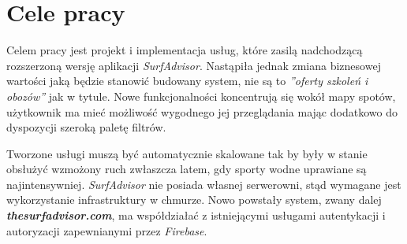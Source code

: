 \newpage

\section{Cele pracy}
Celem pracy jest projekt i implementacja usług, które zasilą nadchodzącą rozszerzoną wersję aplikacji \emph{SurfAdvisor}.
Nastąpiła jednak zmiana biznesowej wartości jaką będzie stanowić budowany system, nie są to \emph{''oferty szkoleń i obozów''} jak w tytule.
Nowe funkcjonalności koncentrują się wokół mapy spotów, użytkownik ma mieć możliwość wygodnego jej przeglądania mając dodatkowo do dyspozycji szeroką paletę filtrów.

Tworzone usługi muszą być automatycznie skalowane tak by były w stanie obsłużyć wzmożony ruch zwłaszcza latem, gdy sporty wodne uprawiane są najintensywniej.
\emph{SurfAdvisor} nie posiada własnej serwerowni, stąd wymagane jest wykorzystanie infrastruktury w chmurze.
Nowo powstały system, zwany dalej \textbf{\emph{thesurfadvisor.com}}, ma współdziałać z istniejącymi usługami autentykacji i autoryzacji zapewnianymi przez \emph{Firebase}.

